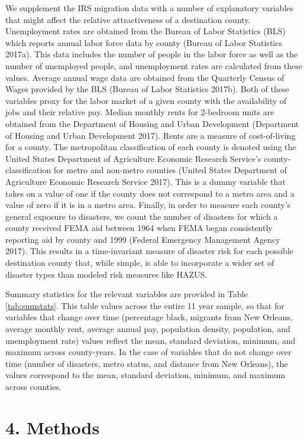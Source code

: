 \documentclass[]{article}
\begin{document}
We supplement the IRS migration data with a number of explanatory
variables that might affect the relative attractiveness of a destination
county. Unemployment rates are obtained from the Bureau of Labor
Statistics (BLS) which reports annual labor force data by county (Bureau
of Labor Statistics 2017a). This data includes the number of people in
the labor force as well as the number of unemployed people, and
unemployment rates are calculated from these values. Average annual wage
data are obtained from the Quarterly Census of Wages provided by the BLS
(Bureau of Labor Statistics 2017b). Both of these variables proxy for
the labor market of a given county with the availability of jobs and
their relative pay. Median monthly rents for 2-bedroom units are
obtained from the Department of Housing and Urban Development
(Department of Housing and Urban Development 2017). Rents are a measure
of cost-of-living for a county. The metropolitan classification of each
county is denoted using the United States Department of Agriculture
Economic Research Service's county-classification for metro and
non-metro counties (United States Department of Agriculture Economic
Research Service 2017). This is a dummy variable that takes on a value
of one if the county does not correspond to a metro area and a value of
zero if it is in a metro area. Finally, in order to measure each
county's general exposure to disasters, we count the number of disasters
for which a county received FEMA aid between 1964 when FEMA began
consistently reporting aid by county and 1999 (Federal Emergency
Management Agency 2017). This results in a time-invariant measure of
disaster risk for each possible destination county that, while simple,
is able to incorporate a wider set of disaster types than modeled risk
measures like HAZUS.

Summary statistics for the relevant variables are provided in Table
\ref{tab:sumstats}. This table values across the entire 11 year sample,
so that for variables that change over time (percentage black, migrants
from New Orleans, average monthly rent, average annual pay, population
density, population, and unemployment rate) values reflect the mean,
standard deviation, minimum, and maximum across county-years. In the
case of variables that do not change over time (number of disasters,
metro status, and distance from New Orleans), the values correspond to
the mean, standard deviation, minimum, and maximum across counties.

\section{4. Methods}\label{methods}
\end{document}
